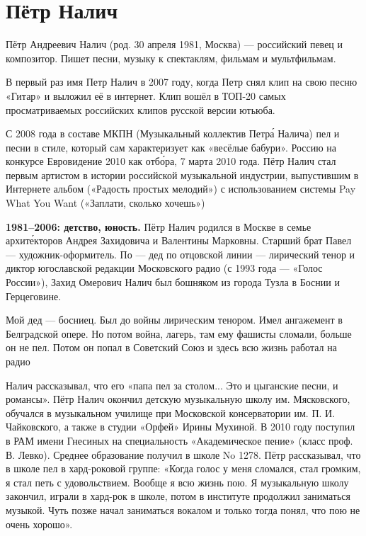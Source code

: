 
\section{Пётр Налич}
Пётр Андреевич Налич (род. 30 апреля 1981, Москва) --- российский певец и композитор. Пишет песни, музыку к спектаклям, фильмам и мультфильмам.

В первый раз имя Петр Налич  в 2007 году, когда Петр снял клип на свою песню «Гитар» и выложил её в интернет. Клип вошёл в ТОП-20 самых просматриваемых российских клипов русской версии ютьюба.

С 2008 года в составе МКПН (Музыкальный коллектив Петр\'{а} Налича) пел и  песни в стиле, который сам характеризует как «весёлые бабури».  Россию на конкурсе Евровидение 2010 как  отб\'{о}ра,  7 марта 2010 года. Пётр Налич стал первым артистом в истории российской музыкальной индустрии, выпустившим в Интернете альбом («Радость простых мелодий») с использованием системы Pay What You Want («Заплати, сколько хочешь»)

\textbf{1981--2006: детство, юность.}
Пётр Налич родился в Москве в семье архит\'{е}кторов Андрея Захидовича и Валентины Марковны. Старший брат Павел --- художник-оформитель. По  --- дед по отцовской линии --- лирический тенор и диктор югославской редакции Московского радио (с 1993 года --- «Голос России»), Захид Омерович Налич был бошняком из города Тузла в Боснии и Герцеговине.

\begin{fancyquotes}
    Мой дед --- босниец. Был до войны лирическим тенором. Имел ангажемент в Белградской опере. Но потом война, лагерь, там ему фашисты  сломали, больше он не пел. Потом он попал в Советский Союз и здесь всю жизнь работал на радио
\end{fancyquotes}

Налич рассказывал, что его «папа  пел за столом... Это и цыганские песни, и романсы». Пётр Налич окончил детскую музыкальную школу им. Мясковского, обучался в музыкальном училище при Московской консерватории им. П. И. Чайковского, а также в студии «Орфей»  Ирины Мухиной. В 2010 году поступил в РАМ имени Гнесиных на специальность «Академическое пение» (класс проф. В. Левко). Среднее образование получил в школе No 1278. Пётр рассказывал, что в школе пел в хард-роковой группе: «Когда голос у меня сломался, стал громким, я стал петь с удовольствием. Вообще я всю жизнь пою. Я музыкальную школу закончил, играли в хард-рок в школе, потом в институте продолжил заниматься музыкой. Чуть позже начал заниматься вокалом и только тогда понял, что пою не очень хорошо».

